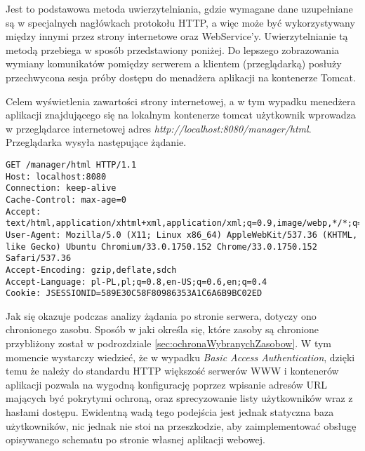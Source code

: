 \documentclass[11pt]{aghdpl}
\begin{document}
Jest to podstawowa metoda uwierzytelniania, gdzie wymagane dane uzupełniane są w specjalnych nagłówkach protokołu HTTP, a więc może być wykorzystywany między innymi przez strony internetowe oraz WebService'y. Uwierzytelnianie tą metodą  przebiega w sposób przedstawiony poniżej. Do lepszego zobrazowania wymiany komunikatów pomiędzy serwerem a klientem (przeglądarką) posłuży przechwycona sesja próby dostępu do menadżera aplikacji na kontenerze Tomcat.


Celem wyświetlenia zawartości strony internetowej, a w tym wypadku menedżera aplikacji znajdującego się na lokalnym kontenerze tomcat użytkownik wprowadza w przeglądarce internetowej adres \emph{http://localhost:8080/manager/html}. Przeglądarka wysyła następujące żądanie.
\begin{lstlisting}
GET /manager/html HTTP/1.1
Host: localhost:8080
Connection: keep-alive
Cache-Control: max-age=0
Accept: text/html,application/xhtml+xml,application/xml;q=0.9,image/webp,*/*;q=0.8
User-Agent: Mozilla/5.0 (X11; Linux x86_64) AppleWebKit/537.36 (KHTML, like Gecko) Ubuntu Chromium/33.0.1750.152 Chrome/33.0.1750.152 Safari/537.36
Accept-Encoding: gzip,deflate,sdch
Accept-Language: pl-PL,pl;q=0.8,en-US;q=0.6,en;q=0.4
Cookie: JSESSIONID=589E30C58F80986353A1C6A6B9BC02ED
\end{lstlisting}

Jak się okazuje podczas analizy żądania po stronie serwera, dotyczy ono chronionego zasobu. Sposób w jaki określa się, które zasoby są chronione przybliżony został w podrozdziale \ref{sec:ochronaWybranychZasobow}. W tym momencie wystarczy wiedzieć, że w wypadku \emph{Basic Access Authentication}, dzięki temu że należy do standardu HTTP większość serwerów WWW i kontenerów aplikacji pozwala na wygodną konfigurację poprzez wpisanie adresów URL mających być pokrytymi ochroną, oraz sprecyzowanie listy użytkowników wraz z hasłami dostępu. Ewidentną wadą tego podejścia jest jednak statyczna baza użytkowników, nic jednak nie stoi na przeszkodzie, aby zaimplementować obsługę opisywanego schematu po stronie własnej aplikacji webowej.
\end{document}
